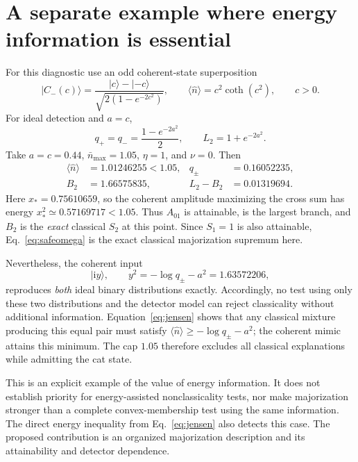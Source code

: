 \documentclass[11pt,a4paper]{article}
\newcommand{\nbar}{\bar n_{\max}}
\newcommand{\ket}[1]{\lvert #1\rangle}
\begin{document}
\section{A separate example where energy information is essential}\label{sec:cat}
For this diagnostic use an odd coherent-state superposition
\begin{equation}
 \ket{C_-(c)}=\frac{\ket c-\ket{-c}}
 {\sqrt{2(1-e^{-2c^2})}},\qquad
 \langle\hat n\rangle=c^2\coth(c^2),\qquad c>0.
 \label{eq:cat}
\end{equation}
For ideal detection and $a=c$,
\begin{equation}
 q_+=q_-=\frac{1-e^{-2a^2}}2,\qquad
 L_2=1+e^{-2a^2}.\label{eq:catq}
\end{equation}
Take $a=c=0.44$, $\nbar=1.05$, $\eta=1$, and $\nu=0$.
Then
\begin{align}
 \langle\hat n\rangle&=1.01246255<1.05,&q_\pm&=0.16052235,\nonumber\\
 B_2&=1.66575835,&L_2-B_2&=0.01319694.\label{eq:catnumbers}
\end{align}
Here $x_*=0.75610659$, so the coherent amplitude maximizing the cross sum
has energy $x_*^2\simeq0.57169717<1.05$.
Thus $A_{01}$ is attainable, is the largest branch, and $B_2$ is the
\emph{exact} classical $S_2$ at this point. Since $S_1=1$ is also attainable,
Eq.~\eqref{eq:safeomega} is the exact classical majorization supremum here.

Nevertheless, the coherent input
\begin{equation}
 \ket{\mathrm i y},\qquad
 y^2=-\log q_\pm-a^2=1.63572206,
 \label{eq:mimic}
\end{equation}
reproduces \emph{both} ideal binary distributions exactly. Accordingly, no test
using only these two distributions and the detector model can reject classicality
without additional information. Equation~\eqref{eq:jensen} shows that any
classical mixture producing this equal pair must satisfy
$\langle\hat n\rangle\geq-\log q_\pm-a^2$; the coherent mimic attains this
minimum. The cap $1.05$ therefore excludes all classical explanations while
admitting the cat state.

This is an explicit example of the value of energy information. It does not
establish priority for energy-assisted nonclassicality tests, nor make majorization
stronger than a complete convex-membership test using the same information.
The direct energy inequality from Eq.~\eqref{eq:jensen} also detects this case.
The proposed contribution is an organized majorization description and its
attainability and detector dependence.
\end{document}
